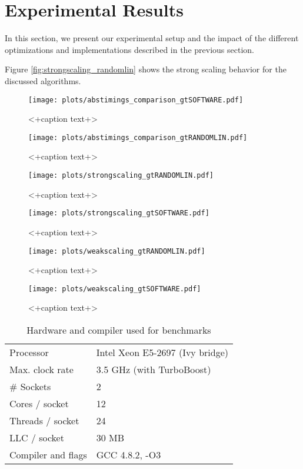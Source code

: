 \section{Experimental Results}\label{sec:exp}
%
In this section, we present our experimental setup and the impact of the different optimizations and implementations described in the previous section.
\par\medskip
%
Figure \ref{fig:strongscaling_randomlin} shows the strong scaling behavior for the discussed algorithms.


\begin{figure}[ht]
	\centering
	\texttt{[image: plots/abstimings\_comparison\_gtSOFTWARE.pdf]}
	\caption{<+caption text+>}
	\label{fig:<+label+>}
\end{figure}
\begin{figure}[ht]
	\centering
	\texttt{[image: plots/abstimings\_comparison\_gtRANDOMLIN.pdf]}
	\caption{<+caption text+>}
	\label{fig:<+label+>}
\end{figure}
\begin{figure}[ht]
	\centering
	\texttt{[image: plots/strongscaling\_gtRANDOMLIN.pdf]}
	\caption{<+caption text+>}
	\label{fig:strongscaling_gtrandom}
\end{figure}
\begin{figure}[ht]
	\centering
	\texttt{[image: plots/strongscaling\_gtSOFTWARE.pdf]}
	\caption{<+caption text+>}
	\label{fig:strongscaling_gtsoftware}
\end{figure}
\begin{figure}[ht]
	\centering
	\texttt{[image: plots/weakscaling\_gtRANDOMLIN.pdf]}
	\caption{<+caption text+>}
	\label{fig:<+label+>}
\end{figure}
\begin{figure}[ht]
	\centering
	\texttt{[image: plots/weakscaling\_gtSOFTWARE.pdf]}
	\caption{<+caption text+>}
	\label{fig:<+label+>}
\end{figure}
  \begin{table}[h]
    \centering
    \begin{tabular}{ll}
    \toprule
    Processor        & Intel Xeon E5-2697 (Ivy bridge) \\
    Max. clock rate  & 3.5 GHz (with TurboBoost)\\
    \# Sockets       & 2 \\
    Cores / socket   & 12 \\
    Threads / socket & 24 \\
    LLC / socket     & 30 MB \\
    \midrule
    Compiler and flags & GCC 4.8.2, -O3\\
    \bottomrule
    \end{tabular}
    \caption{Hardware and compiler used for benchmarks}
    \label{tab:hardware}
  \end{table}
 

